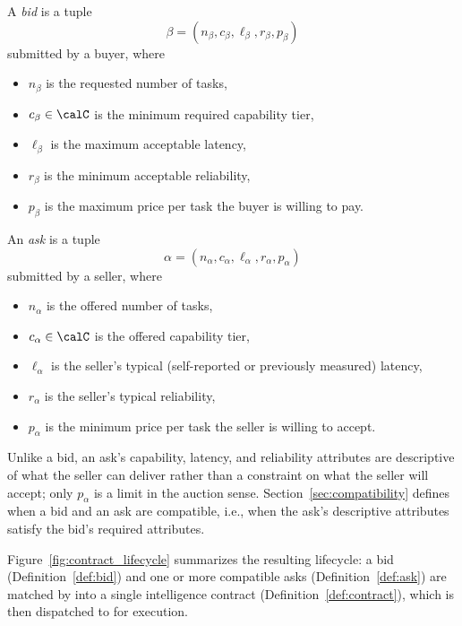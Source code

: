 \begin{definition}[Bid]
\label{def:bid}
A \emph{bid} is a tuple
$$
  \beta = (n_\beta, c_\beta, \ell_\beta, r_\beta, p_\beta)
$$
submitted by a buyer, where
\begin{itemize}
  \item $n_\beta$ is the requested number of tasks,
  \item $c_\beta \in \calC$ is the minimum required capability tier,
  \item $\ell_\beta$ is the maximum acceptable latency,
  \item $r_\beta$ is the minimum acceptable reliability,
  \item $p_\beta$ is the maximum price per task the buyer is willing to
    pay.
\end{itemize}
\end{definition}

\begin{definition}[Ask]
\label{def:ask}
An \emph{ask} is a tuple
$$
  \alpha = (n_\alpha, c_\alpha, \ell_\alpha, r_\alpha, p_\alpha)
$$
submitted by a seller, where
\begin{itemize}
  \item $n_\alpha$ is the offered number of tasks,
  \item $c_\alpha \in \calC$ is the offered capability tier,
  \item $\ell_\alpha$ is the seller's typical (self-reported or previously
    measured) latency,
  \item $r_\alpha$ is the seller's typical reliability,
  \item $p_\alpha$ is the minimum price per task the seller is willing to
    accept.
\end{itemize}
\end{definition}

Unlike a bid, an ask's capability, latency, and reliability attributes are
descriptive of what the seller can deliver rather than a constraint on
what the seller will accept; only $p_\alpha$ is a limit in the auction
sense. Section~\ref{sec:compatibility} defines when a bid and an ask are
compatible, i.e., when the ask's descriptive attributes satisfy the bid's
required attributes.

Figure~\ref{fig:contract_lifecycle} summarizes the resulting lifecycle: a
bid (Definition~\ref{def:bid}) and one or more compatible asks
(Definition~\ref{def:ask}) are matched by \NoesisMarket{} into a single
intelligence contract (Definition~\ref{def:contract}), which is then
dispatched to \NoesisServer{} for execution.

